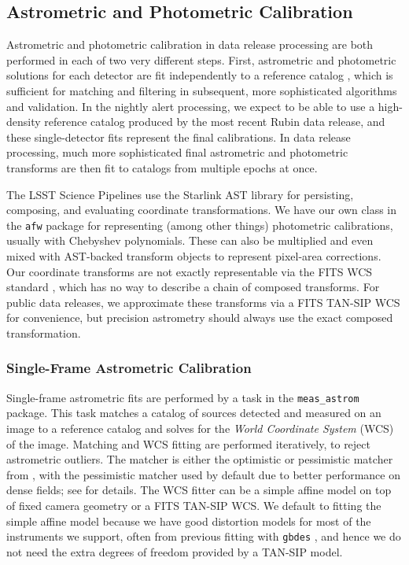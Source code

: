 \subsection{Astrometric and Photometric Calibration}
\label{sec:calibration}

Astrometric and photometric calibration in data release processing are both  performed in each of two very different steps.
First, astrometric and photometric solutions for each detector are fit independently to a reference catalog \citep{DMTN-277}, which is sufficient for matching and filtering in subsequent, more sophisticated algorithms and validation.
In the nightly alert processing, we expect to be able to use a high-density reference catalog produced by the most recent Rubin data release, and these single-detector fits represent the final calibrations.
In data release processing, much more sophisticated final astrometric and photometric transforms are then fit to catalogs from multiple epochs at once.

The LSST Science Pipelines use the Starlink AST library \citep{2016A&C....15...33B} for persisting, composing, and evaluating coordinate transformations.
We have our own class in the \texttt{afw} package for representing (among other things) photometric calibrations, usually with Chebyshev polynomials.
These can also be multiplied and even mixed with AST-backed transform objects to represent pixel-area corrections.
Our coordinate transforms are not exactly representable via the FITS WCS standard \citep{2002A&A...395.1061G}, which has no way to describe a chain of composed transforms.
For public data releases, we approximate these transforms via a FITS TAN-SIP WCS \citep{2005ASPC..347..491S} for convenience, but precision astrometry should always use the exact composed transformation.

\subsubsection{Single-Frame Astrometric Calibration}
\label{sec:astrometryTask}

Single-frame astrometric fits are performed by a task in the \texttt{meas\_astrom} package.
This task matches a catalog of sources detected and measured on an image to a reference catalog and solves for the \textit{World Coordinate System} (WCS) of the image.
Matching and WCS fitting are performed iteratively, to reject astrometric outliers.
The matcher is either the optimistic or pessimistic matcher from \citet{2007PASA...24..189T}, with the pessimistic matcher used by default due to better performance on dense fields; see \citet{DMTN-031} for details.
The WCS fitter can be a simple affine model on top of fixed camera geometry or a FITS TAN-SIP WCS.
We default to fitting the simple affine model because we have good distortion models for most of the instruments we support, often from previous fitting with \texttt{gbdes} , and hence we do not need the extra degrees of freedom provided by a TAN-SIP model.

